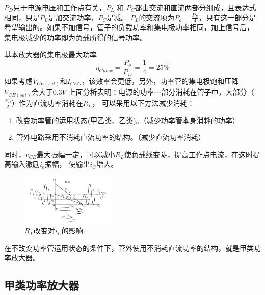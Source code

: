 \documentclass[10pt]{article}
\begin{document}
$P_D$只于电源电压和工作点有关，$P_L$ 和 $P_C$都由交流和直流两部分组成，且表达式相同，只是$P_L$是加交流功率，$P_C$是减。
$P_L$的交流项为$P_o = \frac{P_D}{4}$，只有这一部分是希望输出的。如果不加信号，管子的负载功率和集电极功率相同，加上信号后，
集电极减少的功率即为负载所得的信号功率。\par
基本放大器的集电极最大功率
$$
\eta_{Cmax} = \frac{P_o}{P_D} = \frac{1}{4} = 25\%
$$
如果考虑$V_{CE(sat)}$和$I_{CEO}$，该效率会更低，另外，功率管的集电极饱和压降$V_{CE(sat)}$会大于$0.3V$
上面分析表明：电源的功率一部分消耗在管子中，大部分（$\frac{P_D}{2}$）作为直流功率消耗在$R_L$，
可以采用以下方法减少消耗：
\begin{enumerate}
    \item 改变功率管的运用状态(甲乙类、乙类)。（减少功率管本身消耗的功率）
    \item 管外电路采用不消耗直流功率的结构。（减少直流功率消耗）
\end{enumerate}
同时，$v_{CE}$最大振幅一定，可以减小$R_L$使负载线变陡，提高工作点电流，在这时提高输入激励$i_b$振幅，
使输出$i_C$增大。
\begin{figure}[H] %
  \centering %
  \includegraphics[width=0.4\textwidth]{pictures/2-5.png} %
  \caption{$R_L$改变对$i_C$的影响} %
  \label{fig.2-5} %
\end{figure}
\par
在不改变功率管运用状态的条件下，管外使用不消耗直流功率的结构，就是甲类功率放大器。
\subsection{甲类功率放大器}
\end{document}
